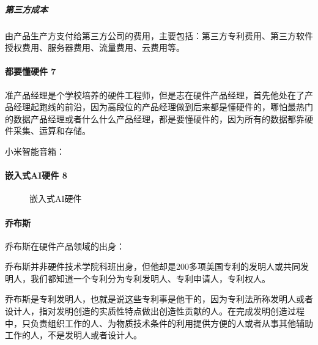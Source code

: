\documentclass[letterpaper,11pt,english]{sphinxmanual}
\begin{document}
\subparagraph{第三方成本}
\label{\detokenize{chapter_project/AI_hardware:id26}}
由产品生产方支付给第三方公司的费用，主要包括：第三方专利费用、第三方软件授权费用、服务器费用、流量费用、云费用等。


\paragraph{都要懂硬件 7\sphinxfootnotemark[717]}
\label{\detokenize{chapter_project/AI_hardware:id27}}%
\begin{footnotetext}[717]\sphinxAtStartFootnote
{}
%
\end{footnotetext}\ignorespaces 
准产品经理是个学校培养的硬件工程师，但是志在硬件产品经理，首先他处在了产品经理起跑线的前沿，因为高段位的产品经理做到后来都是懂硬件的，哪怕最热门的数据产品经理或者什么什么产品经理，都是要懂硬件的，因为所有的数据都靠硬件采集、运算和存储。

小米智能音箱：


\paragraph{嵌入式AI硬件 8\sphinxfootnotemark[718]}
\label{\detokenize{chapter_project/AI_hardware:ai-8}}%
\begin{footnotetext}[718]\sphinxAtStartFootnote
{}
%
\end{footnotetext}\ignorespaces 
\begin{figure}[H]
\centering
\capstart

\noindent{}
\caption{嵌入式AI硬件}\label{\detokenize{chapter_project/AI_hardware:id37}}\end{figure}


\paragraph{乔布斯}
\label{\detokenize{chapter_project/AI_hardware:id28}}
乔布斯在硬件产品领域的出身：

乔布斯并非硬件技术学院科班出身，但他却是200多项美国专利的发明人或共同发明人，我们都知道一个专利分为专利发明人、专利申请人，专利权人。

乔布斯是专利发明人，也就是说这些专利事是他干的，因为专利法所称发明人或者设计人，指对发明创造的实质性特点做出创造性贡献的人。在完成发明创造过程中，只负责组织工作的人、为物质技术条件的利用提供方便的人或者从事其他辅助工作的人，不是发明人或者设计人。
\end{document}
